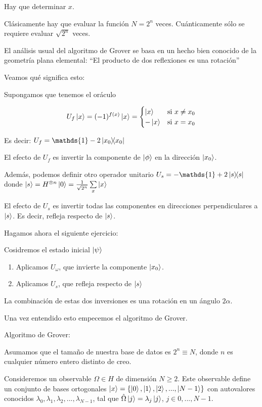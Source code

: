 \documentclass[11pt, spanish]{report}
\begin{document}
Hay que determinar $x$.

Clásicamente hay que evaluar la función $N=2^n$ veces. Cuánticamente sólo se
requiere evaluar $\sqrt{2^n}$ veces.

El análisis usual del algoritmo de Grover se basa en un hecho bien conocido de
la geometría plana elemental: ``El producto de dos reflexiones es una rotación''

Veamos qué significa esto:

Supongamos que tenemos el oráculo

\[U_f \ket{x} = (-1)^{f(x)} \ket{x} =
    \begin{cases}
      \ket{x} & \text{si } x \neq x_0 \\
      - \ket{x} & \text{si } x = x_0
    \end{cases}\]

Es decir: $U_f = \mathds{1} - 2 \ketbra{x_0}{x_0}$
  
El efecto de $U_f$ es invertir la componente de $\ket{\phi}$ en la dirección
$\ket{x_0}$.

Además, podemos definir otro operador unitario $U_s = -\mathds{1} + 2
\ketbra{s}{s}$ donde $\ket{s} = H^{\otimes n} \ket{0} = \frac{1}{\sqrt{2^n}}
\sum\limits_x \ket{x}$

El efecto de $U_s$ es invertir todas las componentes en direcciones
perpendiculares a $\ket{s}$. Es decir, refleja respecto de $\ket{s}$.

Hagamos ahora el siguiente ejercicio:

Cosidremos el estado inicial $\ket{\psi}$

\begin{enumerate}
\item Aplicamos $U_\omega$, que invierte la componente $\ket{x_0}$.
\item Aplicamos $U_s$, que refleja respecto de $\ket{s}$
\end{enumerate}

La combinación de estas dos inversiones es una rotación en un ángulo $2\alpha$.


Una vez entendido esto empecemos el algoritmo de Grover.

Algoritmo de Grover:

Asumamos que el tamaño de nuestra base de datos es $2^n \equiv N$, donde $n$ es cualquier número entero distinto de creo.

Consideremos un observable $\Omega \in H$ de dimensión $N \geq 2$. Este
observable define un conjunto de bases ortogonales $\ket{x} = \{\ket{0},
\ket{1}, \ket{2},...,\ket{N-1}\}$ con autovalores conocidos $\lambda_0,
\lambda_1, \lambda_2,..., \lambda_{N-1}$, tal que $\hat{\Omega} \ket{j} =
\lambda_j \ket{j}$, $j \in {0,...,N-1}$.
\end{document}
